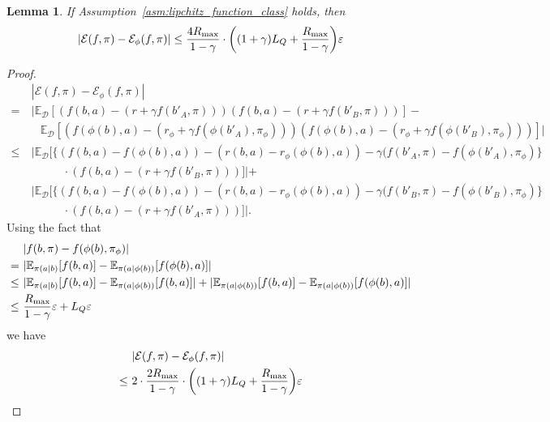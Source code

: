 \documentclass[twoside]{article}
\newtheorem{lemma}{Lemma}
\newcommand{\zyh}[1]{{\color{blue}{ [\textbf{Youheng:}} #1]}}
\begin{document}
\begin{lemma}\label{lem:6}
If Assumption~\ref{asm:lipchitz_function_class} holds, then
    \begin{align}
        |\mathcal{E}(f,\pi)-\mathcal{E}_\phi(f,\pi)|\leq \frac{4R_{\rm max}}{1-\gamma}\cdot\bigg((1+\gamma)L_Q+\frac{R_{\rm max}}{1-\gamma}\bigg)\varepsilon
    \end{align}
\end{lemma}
\begin{proof}
    \begin{align}
        &\ |\mathcal{E}(f,\pi)-\mathcal{E}_\phi(f,\pi)|\nonumber\\
        =&\ |\mathbb{E}_{\mathcal{D}}[(f(b,a)-(r+\gamma f(b'_A,\pi)))(f(b,a)-(r+\gamma f(b'_B,\pi)))]-\nonumber\\
        &\quad\mathbb{E}_{\mathcal{D}}[(f(\phi(b),a)-(r_\phi+\gamma f(\phi(b'_A),\pi_\phi)))(f(\phi(b),a)-(r_\phi+\gamma f(\phi(b'_B),\pi_\phi)))]|\nonumber\\
        \leq&\ |\mathbb{E}_{\mathcal{D}}[\{(f(b,a)-f(\phi(b),a))-(r(b,a)-r_\phi(\phi(b),a))-\gamma (f(b'_A,\pi)-f(\phi(b'_A),\pi_\phi)\}\nonumber\\
        &\quad\quad\quad\cdot(f(b,a)-(r+\gamma f(b'_B,\pi)))]|+\nonumber\\
        &\ |\mathbb{E}_{\mathcal{D}}[\{(f(b,a)-f(\phi(b),a))-(r(b,a)-r_\phi(\phi(b),a))-\gamma (f(b'_B,\pi)-f(\phi(b'_B),\pi_\phi)\}\nonumber\\
        &\quad\quad\quad\cdot(f(b,a)-(r+\gamma f(b'_A,\pi)))]|.
    \end{align}
    Using the fact that
    \begin{align}
        &\ |f(b,\pi)-f(\phi(b),\pi_\phi)|\nonumber\\
        =&\ |\mathbb{E}_{\pi(a|b)}[f(b,a)]-\mathbb{E}_{\pi(a|\phi(b))}[f(\phi(b),a)]|\nonumber\\
        \leq&\ |\mathbb{E}_{\pi(a|b)}[f(b,a)]-\mathbb{E}_{\pi(a|\phi(b))}[f(b,a)]|+|\mathbb{E}_{\pi(a|\phi(b))}[f(b,a)]-\mathbb{E}_{\pi(a|\phi(b))}[f(\phi(b),a)]|\nonumber\\
        \leq&\ \frac{R_{\rm max}}{1-\gamma}\varepsilon+L_Q\varepsilon
    \end{align}
    we have
    \begin{align}
        &\ |\mathcal{E}(f,\pi)-\mathcal{E}_\phi(f,\pi)|\nonumber\\
        \leq&\ 2\cdot\frac{2R_{\rm max}}{1-\gamma}\cdot\bigg((1+\gamma)L_Q+\frac{R_{\rm max}}{1-\gamma}\bigg)\varepsilon
    \end{align}
\end{proof}
\end{document}
